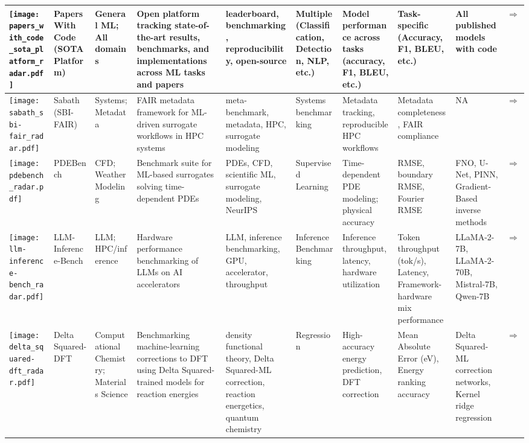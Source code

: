 \begin{landscape}
{\begin{longtable}{|p{}|p{}|p{}|p{}|p{}|p{}|p{}|p{}|p{}|p{}|}
\texttt{[image: papers\_with\_code\_sota\_platform\_radar.pdf]} & Papers With Code (SOTA Platform) & General ML; All domains & Open platform tracking state-of-the-art results, benchmarks, and implementations across ML tasks and papers & leaderboard, benchmarking, reproducibility, open-source & Multiple (Classification, Detection, NLP, etc.) & Model performance across tasks (accuracy, F1, BLEU, etc.) & Task-specific (Accuracy, F1, BLEU, etc.) & All published models with code & \cite{pmlr-v37-blum15}\href{https://paperswithcode.com/sota}{$\Rightarrow$} \\ \hline
\texttt{[image: sabath\_sbi-fair\_radar.pdf]} & Sabath (SBI-FAIR) & Systems; Metadata & FAIR metadata framework for ML-driven surrogate workflows in HPC systems & meta-benchmark, metadata, HPC, surrogate modeling & Systems benchmarking & Metadata tracking, reproducible HPC workflows & Metadata completeness, FAIR compliance & NA & \cite{luszczek2021sabath}\href{https://sbi-fair.github.io/docs/software/sabath/}{$\Rightarrow$} \\ \hline
\texttt{[image: pdebench\_radar.pdf]} & PDEBench & CFD; Weather Modeling & Benchmark suite for ML-based surrogates solving time-dependent PDEs & PDEs, CFD, scientific ML, surrogate modeling, NeurIPS & Supervised Learning & Time-dependent PDE modeling; physical accuracy & RMSE, boundary RMSE, Fourier RMSE & FNO, U-Net, PINN, Gradient-Based inverse methods & \cite{takamoto2024pdebenchextensivebenchmarkscientific}\href{https://github.com/pdebench/PDEBench}{$\Rightarrow$} \\ \hline
\texttt{[image: llm-inference-bench\_radar.pdf]} & LLM-Inference-Bench & LLM; HPC/inference & Hardware performance benchmarking of LLMs on AI accelerators & LLM, inference benchmarking, GPU, accelerator, throughput & Inference Benchmarking & Inference throughput, latency, hardware utilization & Token throughput (tok/s), Latency, Framework-hardware mix performance & LLaMA-2-7B, LLaMA-2-70B, Mistral-7B, Qwen-7B & \cite{10820566}\href{https://github.com/argonne-lcf/LLM-Inference-Bench}{$\Rightarrow$} \\ \hline
\texttt{[image: delta\_squared-dft\_radar.pdf]} & Delta Squared-DFT & Computational Chemistry; Materials Science & Benchmarking machine-learning corrections to DFT using Delta Squared-trained models for reaction energies & density functional theory, Delta Squared-ML correction, reaction energetics, quantum chemistry & Regression & High-accuracy energy prediction, DFT correction & Mean Absolute Error (eV), Energy ranking accuracy & Delta Squared-ML correction networks, Kernel ridge regression & \cite{khrabrov2024nabla2dftuniversalquantumchemistry}\href{https://neurips.cc/virtual/2024/poster/97788}{$\Rightarrow$} \\ \hline

\end{longtable}}
\end{landscape}
